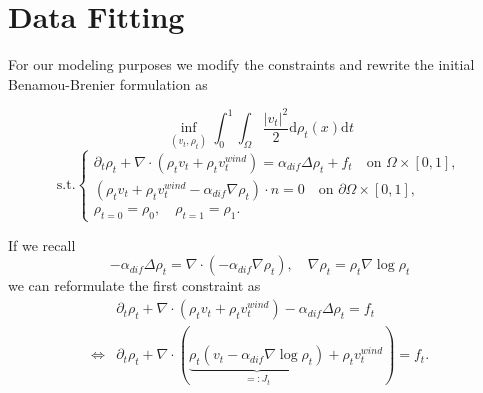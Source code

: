 \newpage
\section{Data Fitting}

For our modeling purposes we modify the constraints and rewrite the initial Benamou-Brenier formulation as 

	$$\inf_{(v_t,\rho_t)} \int_0^1\int_\Omega \frac{|v_t|^2}{2}\mathrm{d}\rho_t(x)\mathrm{d}t$$
	$$\text{s.t.}\begin{cases}\partial_t\rho_t + \nabla \cdot \left(\rho_t v_t + \rho_tv_t^{wind}\right) = \alpha_{dif}\Delta\rho_t + f_t\quad \text{on }\Omega\times[0,1],\\
	\left(\rho_tv_t + \rho_tv_t^{wind} -\alpha_{dif}\nabla\rho_t\right) \cdot n = 0\quad \text{on } \partial\Omega\times[0,1],\\
\rho_{t=0}  = \rho_0,\quad\rho_{t=1} = \rho_1. \end{cases}$$

If we recall 
$$
-\alpha_{dif}\Delta\rho_t = \nabla \cdot (-\alpha_{dif}\nabla\rho_t ),\quad \nabla\rho_t = \rho_t \nabla \log\rho_t
$$
we can reformulate the first constraint as 
\begin{align*}
	&\partial_t\rho_t + \nabla \cdot (\rho_tv_t + \rho_tv_t^{wind}) - \alpha_{dif}\Delta\rho_t = f_t\\
	\iff &\partial_t\rho_t + \nabla \cdot (\underbrace{\rho_t ( v_t - \alpha_{dif}\nabla\log\rho_t)}_{=:J_t} + \rho_tv_t^{wind}) = f_t.
\end{align*}

